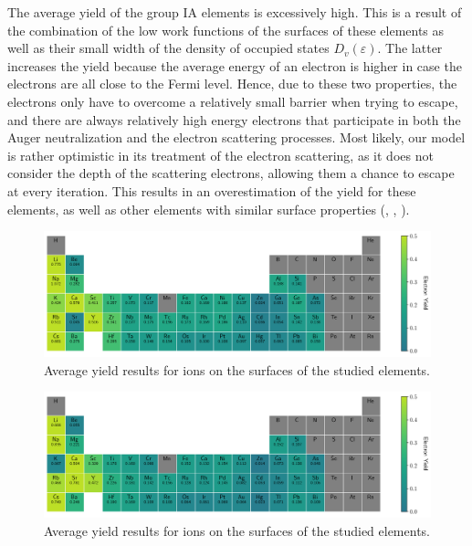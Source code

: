 \begin{refsection}
The average yield of the group IA elements is excessively high. This is a 
result of the combination of the low work functions of the surfaces of these 
elements as well as their small width of the density of occupied states 
$D_v(\varepsilon)$. The latter increases the yield because the average energy 
of an electron is higher in case the electrons are all close to the Fermi 
level. Hence, due to these two properties, the electrons only have 
to overcome a relatively small barrier when trying to escape, and there are 
always relatively high energy electrons that participate in both the Auger 
neutralization and the electron scattering processes. Most likely, our model 
is rather optimistic in its treatment of the electron scattering, as it does 
not consider the depth of the scattering electrons, allowing them a chance 
to escape at every iteration. This results in 
an overestimation of the yield for these elements, as well as other elements 
with similar surface properties (, , ). 
  
\begin{figure}[ht] 
\centering 
\includegraphics[width=\textwidth]{figures/quotas/He_yield_table.png} 
\caption{Average yield results for  ions on the surfaces of the 
studied elements.} 
\label{quotas:fig-He_yield_table} 
\end{figure} 

\begin{figure}[ht] 
\centering 
\includegraphics[width=\textwidth]{figures/quotas/Ne_yield_table.png} 
\caption{Average yield results for  ions on the surfaces of the 
studied elements.} 
\label{quotas:fig-Ne_yield_table} 
\end{figure} 


\end{refsection}

